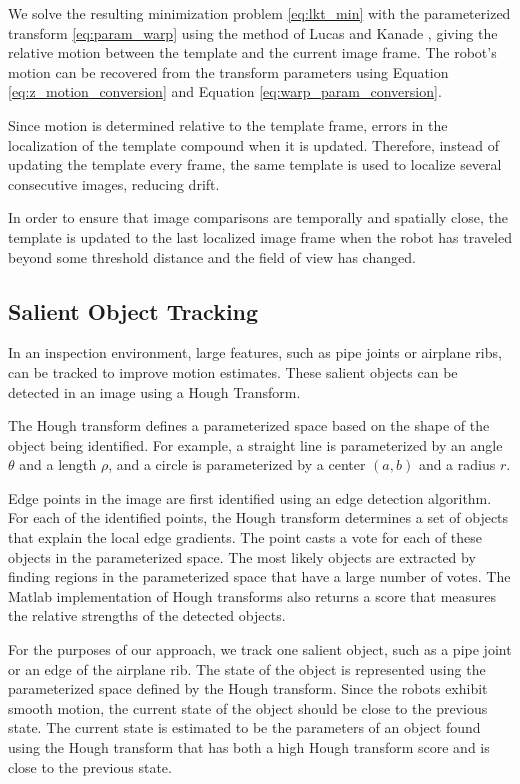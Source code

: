 \documentclass[letterpaper, 10 pt, conference]{ieeeconf}
\begin{document}
We solve the resulting minimization problem \eqref{eq:lkt_min} with the parameterized transform \eqref{eq:param_warp} using the method of Lucas and Kanade \cite{Lucas81, lucaskanade}, giving the relative motion between the template and the current image frame. The robot's motion can be recovered from the transform parameters using Equation \eqref{eq:z_motion_conversion} and Equation \eqref{eq:warp_param_conversion}.

Since motion is determined relative to the template frame, errors in the localization of the template compound when it is updated. Therefore, instead of updating the template every frame, the same template is used to localize several consecutive images, reducing drift.

In order to ensure that image comparisons are temporally and spatially close, the template is updated to the last localized image frame when the robot has traveled beyond some threshold distance and the field of view has changed.

\subsection{Salient Object Tracking}

In an inspection environment, large features, such as pipe joints or airplane ribs, can be tracked to improve motion estimates. These salient objects can be detected in an image using a Hough Transform.

The Hough transform defines a parameterized space based on the shape of the object being identified. For example, a straight line is parameterized by an angle $\theta$ and a length $\rho$, and a circle is parameterized by a center $(a, b)$ and a radius $r$.

Edge points in the image are first identified using an edge detection algorithm. For each of the identified points, the Hough transform determines a set of objects that explain the local edge gradients. The point casts a vote for each of these objects in the parameterized space. The most likely objects are extracted by finding regions in the parameterized space that have a large number of votes. The Matlab implementation of Hough transforms also returns a score that measures the relative strengths of the detected objects.

For the purposes of our approach, we track one salient object, such as a pipe joint or an edge of the airplane rib. The state of the object is represented using the parameterized space defined by the Hough transform.  Since the robots exhibit smooth motion, the current state of the object should be close to the previous state. The current state is estimated to be the parameters of an object found using the Hough transform that has both a high Hough transform score and is close to the previous state.
\end{document}
